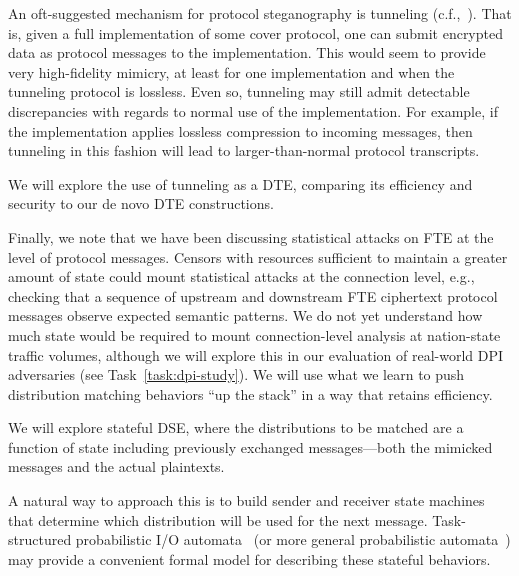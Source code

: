 {%

\noindent An oft-suggested mechanism for protocol steganography is tunneling
(c.f.,~\cite{HoumansadrBS13}).  That is, given a full implementation of some
cover protocol, one can submit encrypted data as protocol messages to the implementation. This would seem to provide very high-fidelity mimicry, at least
for one implementation and when the tunneling protocol is lossless. 
Even so, tunneling may still admit detectable
discrepancies with regards to normal use of the implementation. 
For example, if the implementation applies
lossless compression to incoming messages, then tunneling in this fashion will lead to
larger-than-normal protocol transcripts. 

\begin{task}
\label{task:tun-dte}  We will explore the use of tunneling as a DTE, comparing
its efficiency and security to our de novo DTE constructions.
\end{task}

Finally, we note that we have been discussing statistical attacks on
FTE at the level of protocol messages. Censors with
resources sufficient to maintain a greater amount of state could mount
statistical attacks at the connection level, e.g.,
checking that a sequence of upstream and downstream FTE ciphertext
protocol messages observe expected semantic patterns.  We do
not yet understand how much state would be required to mount
connection-level analysis at nation-state traffic volumes, although we will
explore this in our evaluation of real-world DPI adversaries (see
Task~\ref{task:dpi-study}).  We will use what we learn to 
push distribution matching behaviors ``up the stack'' in a way that retains
efficiency.

\begin{task}
\label{task:stateful-dte}
We will explore stateful DSE, where the distributions to be matched
are a function of state including previously exchanged messages---both the mimicked messages and the actual plaintexts.   
\end{task}
\noindent
A natural way to approach this is to build sender and receiver state
machines that determine which distribution will be
used for the next message. Task-structured probabilistic I/O automata~\cite{cgUCL-CCKLLPS06}
(or more general probabilistic
automata~\cite{Stoelinga02anintroduction}) 
may provide a convenient
formal model for describing these stateful behaviors. 

}
